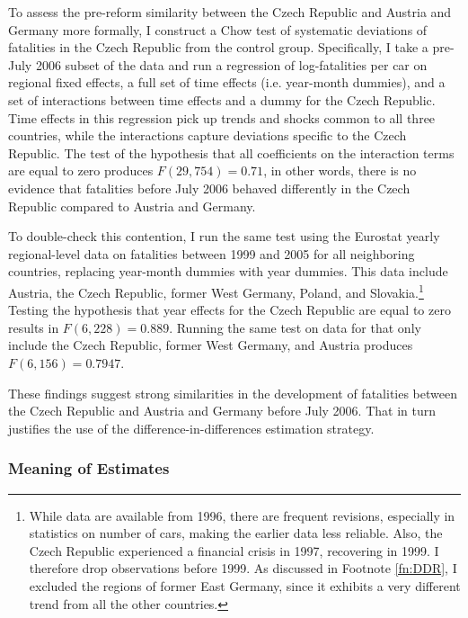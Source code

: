 \documentclass[12pt]{article}
\begin{document}
To assess the pre-reform similarity between the Czech Republic and Austria and
Germany more formally, I construct a Chow test of systematic deviations of
fatalities in the Czech Republic from the control group. Specifically, I take a
pre-July 2006 subset of the data and run a regression of log-fatalities per car
on regional fixed effects, a full set of time effects (i.e. year-month dummies),
and a set of interactions between time effects and a dummy for the Czech
Republic. Time effects in this regression pick up trends and shocks common to
all three countries, while the interactions capture deviations specific to the
Czech Republic. The test of the hypothesis that all coefficients on the
interaction terms are equal to zero produces $F(29, 754) = 0.71$, in other
words, there is no evidence that fatalities before July 2006 behaved differently
in the Czech Republic compared to Austria and Germany.

To double-check this contention, I run the same test using the Eurostat yearly
regional-level data on fatalities between 1999 and 2005 for all neighboring
countries, replacing year-month dummies with year dummies. This data include
Austria, the Czech Republic, former West Germany, Poland, and
Slovakia.\footnote{While data are available from 1996, there are frequent
  revisions, especially in statistics on number of cars, making the earlier data
  less reliable. Also, the Czech Republic experienced a financial crisis in
  1997, recovering in 1999. I therefore drop observations before 1999. As
  discussed in Footnote \ref{fn:DDR}, I excluded the regions of former East
  Germany, since it exhibits a very different trend from all the other
  countries.}  Testing the hypothesis that year effects for the Czech Republic
are equal to zero results in $F(6, 228) = 0.889$.  Running the same test on data
for that only include the Czech Republic, former West Germany, and Austria
produces $F(6, 156) = 0.7947$.

These findings suggest strong similarities in the development of fatalities
between the Czech Republic and Austria and Germany before July 2006. That in
turn justifies the use of the difference-in-differences estimation strategy.

\subsubsection{Meaning of Estimates} %
\end{document}
